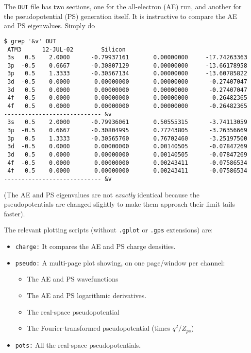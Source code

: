 \documentclass[11pt]{article}
\begin{document}
The {\tt OUT} file has two sections, one for the all-electron (AE) run, and
another for the pseudopotential (PS) generation itself. It is instructive to
compare the AE and PS eigenvalues. Simply do

\begin{verbatim}
$ grep '&v' OUT
 ATM3      12-JUL-02        Silicon
 3s   0.5    2.0000      -0.79937161       0.00000000     -17.74263363
 3p  -0.5    0.6667      -0.30807129       0.00000000     -13.66178958
 3p   0.5    1.3333      -0.30567134       0.00000000     -13.60785822
 3d  -0.5    0.0000       0.00000000       0.00000000      -0.27407047
 3d   0.5    0.0000       0.00000000       0.00000000      -0.27407047
 4f  -0.5    0.0000       0.00000000       0.00000000      -0.26482365
 4f   0.5    0.0000       0.00000000       0.00000000      -0.26482365
---------------------------- &v
 3s   0.5    2.0000      -0.79936061       0.50555315      -3.74113059
 3p  -0.5    0.6667      -0.30804995       0.77243805      -3.26356669
 3p   0.5    1.3333      -0.30565760       0.76702460      -3.25197500
 3d  -0.5    0.0000       0.00000000       0.00140505      -0.07847269
 3d   0.5    0.0000       0.00000000       0.00140505      -0.07847269
 4f  -0.5    0.0000       0.00000000       0.00243411      -0.07586534
 4f   0.5    0.0000       0.00000000       0.00243411      -0.07586534
---------------------------- &v
\end{verbatim}

(The AE and PS eigenvalues are not {\sl exactly} identical because the
pseudopotentials are changed slightly to make them approach their
limit tails faster).

The relevant plotting scripts (without {\tt .gplot} or {\tt .gps}
extensions) are:

\begin{itemize}
\item {\tt charge:} It compares the AE and PS charge densities.
\item {\tt pseudo:} A multi-page plot showing, on one page/window per
channel:
\begin{itemize}
\item The AE and PS wavefunctions
\item The AE and PS logarithmic derivatives.
\item The real-space pseudopotential
\item The Fourier-transformed pseudopotential (times $q^2/Z_{ps}$)
\end{itemize}
\item {\tt pots:} All the real-space pseudopotentials.
\end{itemize}
\end{document}
